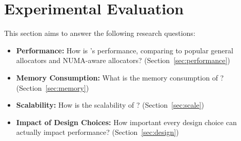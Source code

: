 \section{Experimental Evaluation}
\label{sec:evaluation}

This section aims to answer the following research questions: 

\begin{itemize}
\item \textbf{Performance:} How is \NM{}'s performance, comparing to popular general allocators and NUMA-aware allocators? (Section~\ref{sec:performance}) 
\item \textbf{Memory Consumption:} What is the memory consumption of \NM{}? (Section~\ref{sec:memory})
\item \textbf{Scalability:} How is the scalability of \NM{}? (Section~\ref{sec:scale})
\item \textbf{Impact of Design Choices:} How important every design choice can actually impact performance? (Section~\ref{sec:design})	
\end{itemize}

